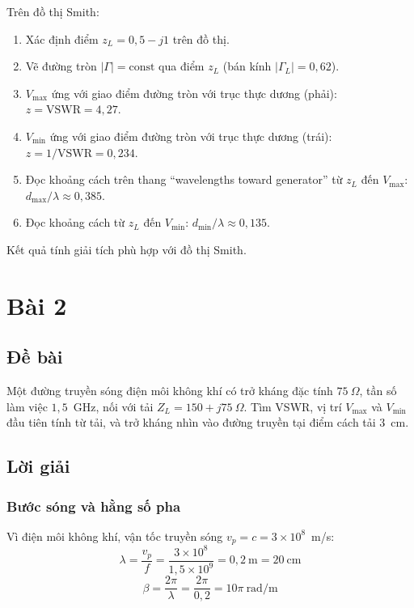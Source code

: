 \documentclass[12pt,a4paper]{article}
\begin{document}
Trên đồ thị Smith:
\begin{enumerate}
    \item Xác định điểm $z_L = 0{,}5 - j1$ trên đồ thị.
    \item Vẽ đường tròn $|\Gamma| = \text{const}$ qua điểm $z_L$ (bán kính $|\Gamma_L| = 0{,}62$).
    \item $V_{\max}$ ứng với giao điểm đường tròn với trục thực dương (phải): $z = \text{VSWR} = 4{,}27$.
    \item $V_{\min}$ ứng với giao điểm đường tròn với trục thực dương (trái): $z = 1/\text{VSWR} = 0{,}234$.
    \item Đọc khoảng cách trên thang ``wavelengths toward generator'' từ $z_L$ đến $V_{\max}$: $d_{\max}/\lambda \approx 0{,}385$.
    \item Đọc khoảng cách từ $z_L$ đến $V_{\min}$: $d_{\min}/\lambda \approx 0{,}135$.
\end{enumerate}

Kết quả tính giải tích phù hợp với đồ thị Smith.

\newpage
\section{Bài 2}

\subsection{Đề bài}
Một đường truyền sóng điện môi không khí có trở kháng đặc tính $75~\Omega$, tần số làm việc $1{,}5$~GHz, nối với tải $Z_L = 150 + j75~\Omega$. Tìm VSWR, vị trí $V_{\max}$ và $V_{\min}$ đầu tiên tính từ tải, và trở kháng nhìn vào đường truyền tại điểm cách tải $3$~cm.

\subsection{Lời giải}

\subsubsection{Bước sóng và hằng số pha}

Vì điện môi không khí, vận tốc truyền sóng $v_p = c = 3 \times 10^8$~m/s:
\[
\lambda = \frac{v_p}{f} = \frac{3 \times 10^8}{1{,}5 \times 10^9} = 0{,}2~\text{m} = 20~\text{cm}
\]
\[
\beta = \frac{2\pi}{\lambda} = \frac{2\pi}{0{,}2} = 10\pi~\text{rad/m}
\]
\end{document}
